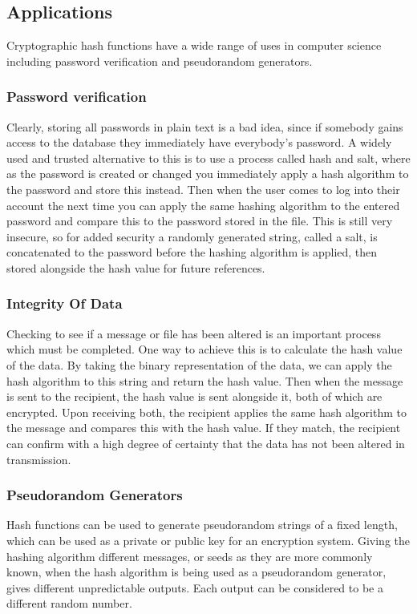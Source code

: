 \subsection{Applications}
Cryptographic hash functions have a wide range of uses in computer science including password verification and pseudorandom generators.
\subsubsection{Password verification}
Clearly, storing all passwords in plain text is a bad idea, since if somebody gains access to the database they immediately have everybody's password. A widely used and trusted alternative to this is to use a process called hash and salt, where as the password is created or changed you immediately apply a hash algorithm to the password and store this instead. Then when the user comes to log into their account the next time you can apply the same hashing algorithm to the entered password and compare this to the password stored in the file. This is still very insecure, so for added security a randomly generated string, called a salt, is concatenated to the password before the hashing algorithm is applied, then stored alongside the hash value for future references.
\subsubsection{Integrity Of Data}
Checking to see if a message or file has been altered is an important process which must be completed. One way to achieve this is to calculate the hash value of the data. By taking the binary representation of the data, we can apply the hash algorithm to this string and return the hash value. Then when the message is sent to the recipient, the hash value is sent alongside it, both of which are encrypted. Upon receiving both, the recipient applies the same hash algorithm to the message and compares this with the hash value. If they match, the recipient can confirm with a high degree of certainty that the data has not been altered in transmission.
\subsubsection{Pseudorandom Generators}
Hash functions can be used to generate pseudorandom strings of a fixed length, which can be used as a private or public key for an encryption system. Giving the hashing algorithm different messages, or seeds as they are more commonly known, when the hash algorithm is being used as a pseudorandom generator, gives different unpredictable outputs. Each output can be considered to be a different random number.
